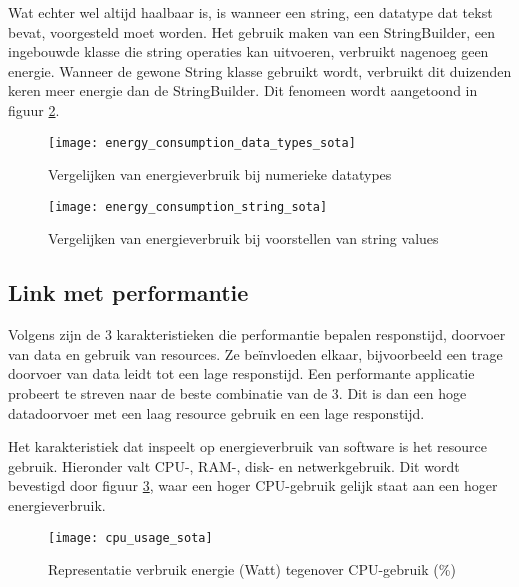Wat echter wel altijd haalbaar is, is wanneer een string, een datatype dat tekst bevat, voorgesteld moet worden. Het gebruik maken van een StringBuilder, een ingebouwde klasse die string operaties kan uitvoeren, verbruikt nagenoeg geen energie. Wanneer de gewone String klasse gebruikt wordt, verbruikt dit duizenden keren meer energie dan de StringBuilder. Dit fenomeen wordt aangetoond in figuur \ref{energy_consumption_string_sota}. 

\bigskip


\begin{figure}[H]
    \texttt{[image: energy\_consumption\_data\_types\_sota]}
    \caption[Energieverbruik numerieke datatypes]{Vergelijken van energieverbruik bij numerieke datatypes \autocite{Dutta2023}}
    \label{energy_consumption_data_types_sota}
\end{figure}


\begin{figure}[H]
    \texttt{[image: energy\_consumption\_string\_sota]}
    \centering
    \caption[Energieverbruik string voorstelling]{Vergelijken van energieverbruik bij voorstellen van string values \autocite{Dutta2023}}
    \label{energy_consumption_string_sota}

\end{figure}


\subsection{Link met performantie}
Volgens \textcite{Lubomski2020} zijn de 3 karakteristieken die performantie bepalen responstijd, doorvoer van data en gebruik van resources. Ze beïnvloeden elkaar, bijvoorbeeld een trage doorvoer van data leidt tot een lage responstijd. Een performante applicatie probeert te streven naar de beste combinatie van de 3. Dit is dan een hoge datadoorvoer met een laag resource gebruik en een lage responstijd. 

\bigskip

Het karakteristiek dat inspeelt op energieverbruik van software is het resource gebruik. Hieronder valt CPU-, RAM-, disk- en netwerkgebruik. Dit wordt bevestigd door figuur \ref{cpu_usage_sota}, waar een hoger CPU-gebruik gelijk staat aan een hoger energieverbruik.\\



\begin{figure}[h!]
    \texttt{[image: cpu\_usage\_sota]}
    \centering
    \caption{Representatie verbruik energie (Watt) tegenover CPU-gebruik (\%) \autocite{Ciancarini2020}}
    \label{cpu_usage_sota}
\end{figure}

